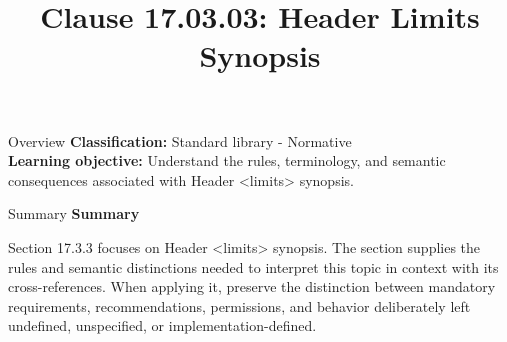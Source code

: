 \documentclass[10pt,letterpaper]{article}
\title{Clause 17.03.03: Header Limits Synopsis}
\author{}
\date{}
\begin{document}
\maketitle
\begin{CornellOverviewBox}{Overview}
\textbf{Classification:} Standard library - Normative\\[2pt]
\textbf{Learning objective:} Understand the rules, terminology, and semantic consequences associated with Header <limits> synopsis.
\end{CornellOverviewBox}\begin{CornellSummaryBox}{Summary}
{\sffamily\bfseries\color{Accent} Summary}\par\vspace{3pt}Section 17.3.3 focuses on Header <limits> synopsis. The section supplies the rules and semantic distinctions needed to interpret this topic in context with its cross-references. When applying it, preserve the distinction between mandatory requirements, recommendations, permissions, and behavior deliberately left undefined, unspecified, or implementation-defined.
\end{CornellSummaryBox}
\end{document}
